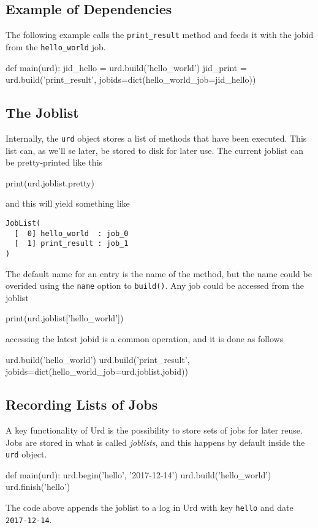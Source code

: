 \documentclass[a4paper]{article}
\begin{document}
\subsection{Example of Dependencies}
The following example calls the \texttt{print\_result} method and
feeds it with the jobid from the \texttt{hello\_world} job.
\begin{python}
def main(urd):
  jid_hello = urd.build('hello_world')
  jid_print = urd.build('print_result', jobids=dict(hello_world_job=jid_hello))
\end{python}

\clearpage



\subsection{The Joblist}
Internally, the \texttt{urd} object stores a list of methods that have
been executed.  This list can, as we'll se later, be stored to disk
for later use.  The current joblist can be pretty-printed like this
\begin{python}
  print(urd.joblist.pretty)
\end{python}
and this will yield something like
\begin{verbatim}
JobList(
  [  0] hello_world  : job_0
  [  1] print_result : job_1
)
\end{verbatim}
The default name for an entry is the name of the method, but the name
could be overided using the \texttt{name} option to
\texttt{build()}.
Any job could be accessed from the joblist
\begin{python}
  print(urd.joblist['hello_world'])
\end{python}
accessing the latest jobid is a common operation, and it is done as follows
\begin{python}
  urd.build('hello_world')
  urd.build('print_result', jobids=dict(hello_world_job=urd.joblist.jobid))
\end{python}


\subsection{Recording Lists of Jobs}
A key functionality of Urd is the possibility to store sets of jobs
for later reuse.  Jobs are stored in what is called \textsl{joblists},
and this happens by default inside the \texttt{urd} object.

\begin{python}
def main(urd):
  urd.begin('hello', '2017-12-14')
  urd.build('hello_world')
  urd.finish('hello')
\end{python}
The code above appends the joblist to a log in Urd with key
\texttt{hello} and date \texttt{2017-12-14}.
\end{document}
